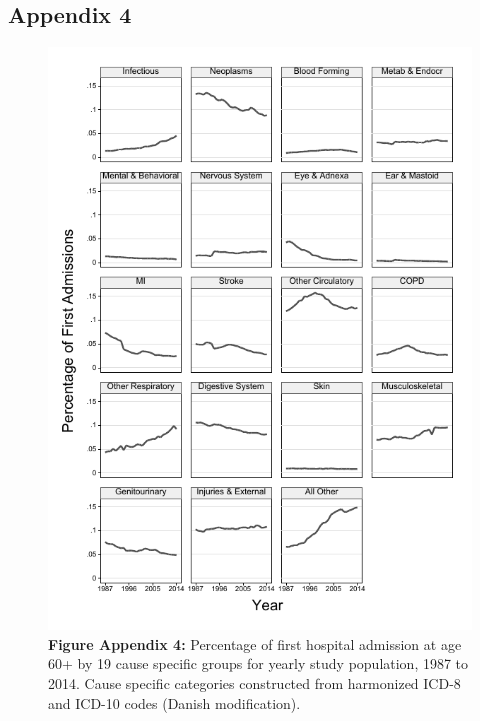 \newpage

\subsection{Appendix 4}

	\begin{figure}[H]
		\centering
		\includegraphics[scale=1.35]{Paper_3/Appendix_4.pdf}
		\caption*{\textbf{Figure Appendix 4:} 	Percentage of first hospital admission 
												at age 60+ by 19 cause specific groups 
												for yearly study population, 1987 to 
												2014. Cause specific categories constructed 
												from harmonized ICD-8 and ICD-10 codes 
												(Danish modification).}
	\label{ch4:app4}
	\end{figure}
	
	
